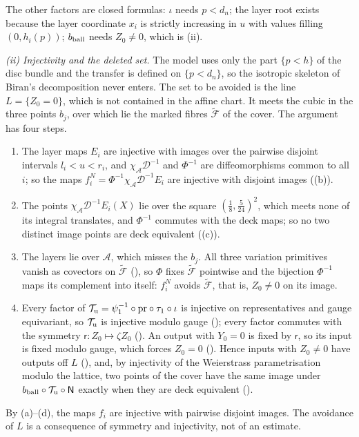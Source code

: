 The other factors are closed formulas: $\iota$ needs $p<d_n$; the layer root exists because the layer coordinate $x_i$
is strictly increasing in $u$ with values filling $(0,h_i(p))$; $b_{\rm ball}$ needs $Z_0\ne0$, which is (ii).

\emph{(ii) Injectivity and the deleted set.} The model uses only the part $\{p<h\}$ of the disc bundle and the
transfer is defined on $\{p<d_n\}$, so the isotropic skeleton of Biran's decomposition never enters. The set to be
avoided is the line $L=\{Z_0=0\}$, which is not contained in the affine chart. It meets the cubic in the three points
$b_j$, over which lie the marked fibres $\widetilde{\mathcal F}$ of the cover. The argument has four steps.
\begin{enumerate}[label=(\alph*)]
\item The layer maps $E_i$ are injective with images over the pairwise disjoint intervals $l_i<u<r_i$, and
$\chi_{\mathcal A}\mathcal D^{-1}$ and $\Phi^{-1}$ are diffeomorphisms common to all $i$; so the maps
$f^N_i=\Phi^{-1}\chi_{\mathcal A}\mathcal D^{-1}E_i$ are injective with disjoint images
((b)).
\item The points $\chi_{\mathcal A}\mathcal D^{-1}E_i(X)$ lie over the square $(\frac18,\frac5{24})^2$, which meets
none of its integral translates, and $\Phi^{-1}$ commutes with the deck maps; so no two distinct image points are
deck equivalent ((c)).
\item The layers lie over $\mathcal A$, which misses the $b_j$. All three variation primitives vanish as covectors on
$\widetilde{\mathcal F}$ (), so $\Phi$ fixes $\widetilde{\mathcal F}$ pointwise and the bijection
$\Phi^{-1}$ maps its complement into itself: $f^N_i$ avoids $\widetilde{\mathcal F}$, that is, $Z_0\ne0$ on its image.
\item Every factor of $\mathcal T_{\rm u}=\psi_1^{-1}\circ\mathrm{pr}\circ\tau_1\circ\iota$ is injective on representatives and
gauge equivariant, so $\mathcal T_{\rm u}$ is injective modulo gauge (); every factor
commutes with the symmetry $\mathsf r\colon Z_0\mapsto\zeta Z_0$ (). An output with $Y_0=0$ is fixed by $\mathsf r$,
so its input is fixed modulo gauge, which forces $Z_0=0$ (). Hence inputs with $Z_0\ne0$ have
outputs off $L$ (), and, by injectivity of the Weierstrass parametrisation modulo the
lattice, two points of the cover have the same image under $b_{\rm ball}\circ\mathcal T_{\rm u}\circ\mathsf N$ exactly when
they are deck equivalent ().
\end{enumerate}
By (a)--(d), the maps $f_i$ are injective with pairwise disjoint images. The
avoidance of $L$ is a consequence of symmetry and injectivity, not of an estimate.


